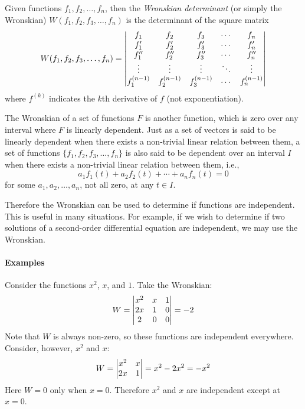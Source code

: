 \documentclass{article}
\begin{document}
Given functions $f_1, f_2, \dotsc, f_n$, then the \emph{Wronskian determinant} (or simply the Wronskian) $W(f_1, f_2, f_3, \dotsc, f_n)$ is the determinant of the square matrix
\[
W(f_1, f_2, f_3, \dotsc, f_n) = \left\lvert\begin{array}{@{}ccccc@{}}
f_1 & f_2 & f_3 & \cdots & f_n\\
f_1' & f_2' & f_3' & \cdots & f_n'\\
f_1'' & f_2'' & f_3'' & \cdots & f_n''\\
\vdots & \vdots & \vdots & \ddots & \vdots\\
f_1^{(n-1)} & f_2^{(n-1)} & f_3^{(n-1)} & \cdots & f_n^{(n-1)}\\
\end{array}\right\rvert
\]
where $f^{(k)}$ indicates the $k$th derivative of $f$ (not exponentiation).

The Wronskian of a set of functions $F$ is another function, which is zero over any interval where $F$ is linearly dependent. Just as a set of vectors is said to be linearly dependent when there exists a non-trivial linear relation between them, a set of functions $\{f_1, f_2, f_3, \dotsc, f_n\}$ is also said to be dependent over an interval $I$ when there exists a non-trivial linear relation between them, i.e.,
\[
a_1 f_1(t) + a_2 f_2(t) + \dotsb + a_n f_n(t) = 0
\]
for some $a_1, a_2, \dotsc, a_n$, not all zero, at any $t \in I$.

Therefore the Wronskian can be used to determine if functions are independent. This is useful in many situations. For example, if we wish to determine if two solutions of a second-order differential equation are independent, we may use the Wronskian.

\paragraph{Examples}

Consider the functions $x^2$, $x$, and $1$. Take the Wronskian:
\[
W = \left\lvert\begin{array}{@{}ccc@{}}
x^2 & x & 1\\
2x & 1 & 0\\
2 & 0 & 0\\
\end{array}\right\rvert = -2
\]
Note that $W$ is always non-zero, so these functions are independent everywhere. Consider, however, $x^2$ and $x$:
\[
W = \left\lvert\begin{array}{@{}cc@{}}
x^2 & x\\
2x & 1\\
\end{array}\right\rvert = x^2 - 2x^2 = -x^2
\]
Here $W = 0$ only when $x = 0$. Therefore $x^2$ and $x$ are independent except at $x = 0$.
\end{document}
